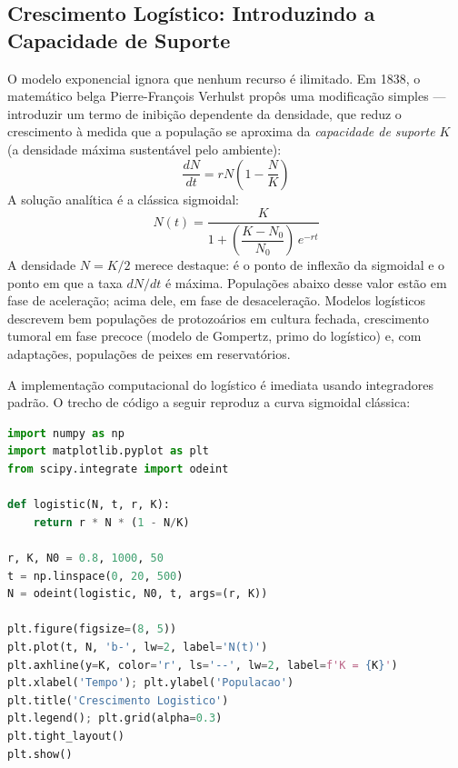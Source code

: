 \subsection{Crescimento Logístico: Introduzindo a Capacidade de Suporte}
\label{sub:image10-logistico}

O modelo exponencial ignora que nenhum recurso é ilimitado. Em 1838, o
matemático belga Pierre-François Verhulst propôs uma modificação simples ---
introduzir um termo de inibição dependente da densidade, que reduz o
crescimento à medida que a população se aproxima da \emph{capacidade de suporte}
$K$ (a densidade máxima sustentável pelo ambiente):
\begin{equation}
\frac{dN}{dt} = r N\left(1 - \frac{N}{K}\right)
\end{equation}
A solução analítica é a clássica sigmoidal:
\begin{equation}
N(t) = \frac{K}{1 + \left(\dfrac{K - N_0}{N_0}\right)\, e^{-rt}}
\end{equation}
A densidade $N = K/2$ merece destaque: é o ponto de inflexão da sigmoidal e o
ponto em que a taxa $dN/dt$ é máxima. Populações abaixo desse valor estão em
fase de aceleração; acima dele, em fase de desaceleração. Modelos logísticos
descrevem bem populações de protozoários em cultura fechada, crescimento
tumoral em fase precoce (modelo de Gompertz, primo do logístico) e, com
adaptações, populações de peixes em reservatórios.

A implementação computacional do logístico é imediata usando integradores
padrão. O trecho de código a seguir reproduz a curva sigmoidal clássica:

\begin{lstlisting}[language=Python, caption=Modelo logistico]
import numpy as np
import matplotlib.pyplot as plt
from scipy.integrate import odeint

def logistic(N, t, r, K):
    return r * N * (1 - N/K)

r, K, N0 = 0.8, 1000, 50
t = np.linspace(0, 20, 500)
N = odeint(logistic, N0, t, args=(r, K))

plt.figure(figsize=(8, 5))
plt.plot(t, N, 'b-', lw=2, label='N(t)')
plt.axhline(y=K, color='r', ls='--', lw=2, label=f'K = {K}')
plt.xlabel('Tempo'); plt.ylabel('Populacao')
plt.title('Crescimento Logistico')
plt.legend(); plt.grid(alpha=0.3)
plt.tight_layout()
plt.show()
\end{lstlisting}

